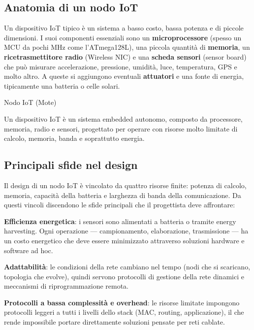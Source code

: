\documentclass[
  italian,
  openany]{book}
\begin{document}
\subsection{Anatomia di un nodo IoT}\label{anatomia-di-un-nodo-iot}

Un dispositivo IoT tipico è un sistema a basso costo, bassa potenza e di
piccole dimensioni. I suoi componenti essenziali sono un
\textbf{microprocessore} (spesso un MCU da pochi MHz come l'ATmega128L),
una piccola quantità di \textbf{memoria}, un \textbf{ricetrasmettitore
radio} (Wireless NIC) e una \textbf{scheda sensori} (sensor board) che
può misurare accelerazione, pressione, umidità, luce, temperatura, GPS e
molto altro. A queste si aggiungono eventuali \textbf{attuatori} e una
fonte di energia, tipicamente una batteria o celle solari.

\begin{calloutdefinition}{Nodo IoT (Mote)}

Un dispositivo IoT è un sistema embedded autonomo, composto da
processore, memoria, radio e sensori, progettato per operare con risorse
molto limitate di calcolo, memoria, banda e soprattutto energia.

\end{calloutdefinition}

\subsection{Principali sfide nel
design}\label{principali-sfide-nel-design}

Il design di un nodo IoT è vincolato da quattro risorse finite: potenza
di calcolo, memoria, capacità della batteria e larghezza di banda della
comunicazione. Da questi vincoli discendono le sfide principali che il
progettista deve affrontare:

\textbf{Efficienza energetica}: i sensori sono alimentati a batteria o
tramite energy harvesting. Ogni operazione --- campionamento,
elaborazione, trasmissione --- ha un costo energetico che deve essere
minimizzato attraverso soluzioni hardware e software ad hoc.

\textbf{Adattabilità}: le condizioni della rete cambiano nel tempo (nodi
che si scaricano, topologia che evolve), quindi servono protocolli di
gestione della rete dinamici e meccanismi di riprogrammazione remota.

\textbf{Protocolli a bassa complessità e overhead}: le risorse limitate
impongono protocolli leggeri a tutti i livelli dello stack (MAC,
routing, applicazione), il che rende impossibile portare direttamente
soluzioni pensate per reti cablate.
\end{document}
